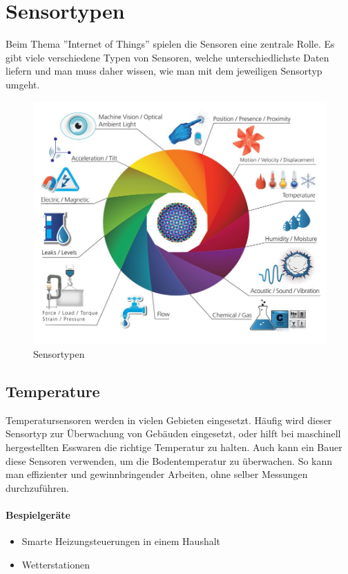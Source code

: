 \section{Sensortypen}
Beim Thema ''Internet of Things'' spielen die Sensoren eine zentrale Rolle. Es gibt viele verschiedene Typen von Sensoren, welche unterschiedlichste Daten liefern und man muss daher wissen, wie man mit dem jeweiligen Sensortyp umgeht. 
\begin{figure}[H]
\centering
\includegraphics[scale=0.35]{images/sensors.jpg}
\caption{Sensortypen\cite{SensorImage}}
\end{figure}

\subsection{Temperature}
Temperatursensoren werden in vielen Gebieten eingesetzt. Häufig wird dieser Sensortyp zur Überwachung von Gebäuden eingesetzt, oder hilft bei maschinell hergestellten Esswaren die richtige Temperatur zu halten. Auch kann ein Bauer diese Sensoren verwenden, um die Bodentemperatur zu überwachen. So kann man effizienter und gewinnbringender Arbeiten, ohne selber Messungen durchzuführen.
\paragraph{Bespielgeräte}
\begin{itemize}
\item	Smarte Heizungsteuerungen in einem Haushalt
\item	Wetterstationen
\end{itemize}


